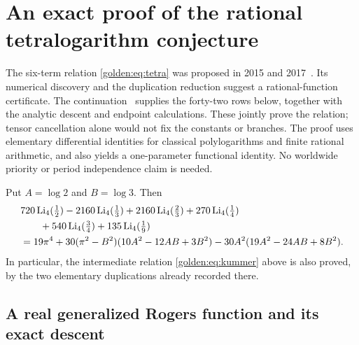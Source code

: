 
\section{An exact proof of the rational tetralogarithm conjecture}
\label{rattetra:sec}

The six-term relation \eqref{golden:eq:tetra} was proposed in 2015 and
2017~\cite{rattetra:2015,rattetra:2017}. Its numerical discovery and the
duplication reduction suggest a rational-function certificate. The
continuation~\cite{rattetra:report} supplies the forty-two rows below, together
with the analytic descent and endpoint calculations. These jointly prove the
relation; tensor cancellation alone would not fix the constants or branches.
The proof uses elementary differential identities for classical
polylogarithms and finite rational arithmetic, and also yields a
one-parameter functional identity. No worldwide priority or period
independence claim is needed.

\begin{theorem}
\label{rattetra:thm:main}
Put $A=\log2$ and $B=\log3$. Then
\begin{align}
&720\operatorname{Li}_4(\tfrac12)
 -2160\operatorname{Li}_4(\tfrac13)
 +2160\operatorname{Li}_4(\tfrac23)
 +270\operatorname{Li}_4(\tfrac14)\notag\\
&\qquad+540\operatorname{Li}_4(\tfrac34)
 +135\operatorname{Li}_4(\tfrac19)\notag\\
&=19\pi^4+30(\pi^2-B^2)(10A^2-12AB+3B^2)
       -30A^2(19A^2-24AB+8B^2).
\label{rattetra:eq:main}
\end{align}
In particular, the intermediate relation \eqref{golden:eq:kummer}
above is also proved, by the two elementary duplications
already recorded there.
\end{theorem}

\subsection{A real generalized Rogers function and its exact descent}

